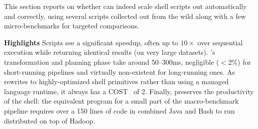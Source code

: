 \documentclass[letterpaper,twocolumn,10pt]{article}
\newcommand{\heading}[1]{\vspace{4pt}\noindent\textbf{#1}\enspace}
\newcommand{\TODO}[1]{\hl{\textbf{TODO:} #1}\xspace}
\newcommand{\fixme}[1]{{\color{red}#1}}
\newcommand{\kk}[1]{[{\color{magenta}kk: #1}]}
\begin{document}




This section reports on whether \sys can indeed scale shell scripts out automatically and correctly, using several scripts collected out from the wild along with a few micro-benchmarks for targeted comparisons.


\heading{Highlights}
\fixme{
Scripts see a significant speedup, often up to $10\times$ over sequential execution while returning identical results (on very large datasets).
\sys's transformation and planning phase take around 50--300ms, negligible ($<$2\%) for short-running pipelines and virtually non-existent for long-running ones.
As \sys rewrites to highly-optimized shell primitives rather than using a managed language runtime, it always has a COST~\cite{mcsherryscalability} of 2.
Finally, \sys preserves the productivity of the shell:
  the equivalent program for a small part of the macro-benchmark pipeline requires over a 150 lines of code in combined Java and Bash to run distributed on top of Hadoop.
}
\end{document}
